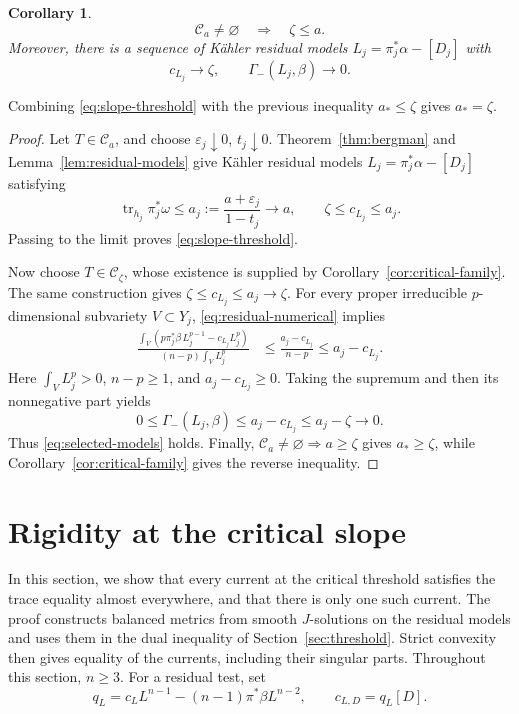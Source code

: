 \documentclass[reqno]{amsart}
\numberwithin{equation}{section}
\newtheorem{corollary}[theorem]{Corollary}
\theoremstyle{definition}
\DeclareMathOperator{\tr}{tr}
\begin{document}
\begin{corollary}\label{cor:threshold-models}
\begin{equation}\label{eq:slope-threshold}
\mathcal C_a\ne\varnothing\quad\Longrightarrow\quad\zeta\le a.
\end{equation}
Moreover, there is a sequence of \emph{K\"ahler} residual models $L_j=\pi_j^*\alpha-[D_j]$ with
\begin{equation}\label{eq:selected-models}
c_{L_j}\longrightarrow\zeta,\qquad
\Gamma_-(L_j,\beta)\longrightarrow0.
\end{equation}
\end{corollary}

 Combining \eqref{eq:slope-threshold} with the previous inequality $a_*\le\zeta$ gives $a_*=\zeta$.
 
\begin{proof}
Let $T\in\mathcal C_a$, and choose
$\varepsilon_j\downarrow0$, $t_j\downarrow0$.
Theorem~\ref{thm:bergman} and 
Lemma~\ref{lem:residual-models} give K\"ahler
residual models $L_j=\pi_j^*\alpha-[D_j]$ satisfying
\[
\tr_{h_j}\pi_j^*\omega\le
a_j:=\frac{a+\varepsilon_j}{1-t_j}\longrightarrow a,\qquad
\zeta\le c_{L_j}\le a_j.
\]
Passing to the limit proves
\eqref{eq:slope-threshold}.

Now choose $T\in\mathcal C_\zeta$, whose existence is supplied
by Corollary~\ref{cor:critical-family}.
The same construction gives
$\zeta\le c_{L_j}\le a_j\to\zeta$.
For every proper irreducible $p$-dimensional subvariety $V\subset Y_j$,
\eqref{eq:residual-numerical} implies
\[
\begin{aligned}
\frac{\int_V(p\pi_j^*\beta\,L_j^{p-1}-c_{L_j}L_j^p)}
     {(n-p)\int_VL_j^p}
&\le\frac{a_j-c_{L_j}}{n-p}\le a_j-c_{L_j}.
\end{aligned}
\]
Here $\int_VL_j^p>0$, $n-p\ge1$, and $a_j-c_{L_j}\ge0$.
Taking the supremum and then its nonnegative part yields
\[
0\le\Gamma_-(L_j,\beta)
\le a_j-c_{L_j}\le a_j-\zeta\longrightarrow0.
\]
Thus \eqref{eq:selected-models}
holds. Finally, $\mathcal C_a\ne\varnothing\Rightarrow a\ge\zeta$
gives $a_*\ge\zeta$, while
Corollary~\ref{cor:critical-family} gives the
reverse inequality.
\end{proof}

\section{Rigidity at the critical slope}\label{sec:rigidity}
In this section, we show that every current at the critical threshold satisfies
the trace equality almost everywhere, and that there is only one
such current. The proof constructs balanced metrics from smooth
$J$-solutions on the residual models and uses them in the dual
inequality of Section~\ref{sec:threshold}. Strict convexity then gives equality of the currents, including
their singular parts.
Throughout this section, $n\ge3$. For a residual test, set
\[
 q_L=c_LL^{n-1}-(n-1)\pi^*\beta L^{n-2},\qquad
 c_{L,D}=q_L[D].
\]
\end{document}
